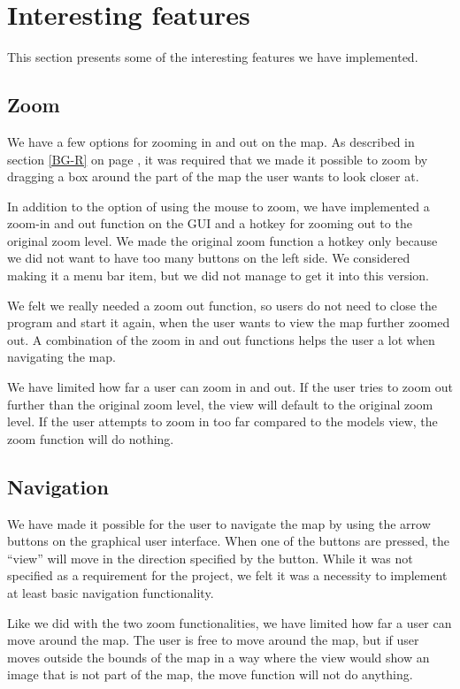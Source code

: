 \section{Interesting features}
\label{UIA-IF}
This section presents some of the interesting features we have implemented.
\subsection{Zoom}
\label{UIA-IF-Z}
We have a few options for zooming in and out on the map. As described in
section \ref{BG-R}  on page \pageref{BG-R}, it
was required that we made it possible to zoom by dragging a box around the part 
of the map the user wants to look closer at.

In addition to the option of using the mouse to zoom, we have implemented a
zoom-in and out function on the GUI and a hotkey for zooming out to the original
zoom level. We made the original zoom function a hotkey only because we did not
want to have too many buttons on the left side. We considered making it a menu bar
item, but we did not manage to get it into this version.

We felt we really needed a zoom out function, so users do not need to close the
program and start it again, when the user wants to view the map further zoomed
out. A combination of the zoom in and out functions helps the user a lot when
navigating the map.

We have limited how far a user can zoom in and out. If the user tries to zoom
out further than the original zoom level, the view will default to the original
zoom level. If the user attempts to zoom in too far compared to the models view,
the zoom function will do nothing.

\subsection{Navigation}
\label{UIA-IF-N}
We have made it possible for the user to navigate the map by using the arrow
buttons on the graphical user interface. When one of the buttons are pressed,
the ``view'' will move in the direction specified by the button. While it was
not specified as a requirement for the project, we felt it was a necessity to
implement at least basic navigation functionality.

Like we did with the two zoom functionalities, we have limited how far a user
can move around the map. The user is free to move around the map, but if user
moves outside the bounds of the map in a way where the view would show an image
that is not part of the map, the move function will not do anything.


